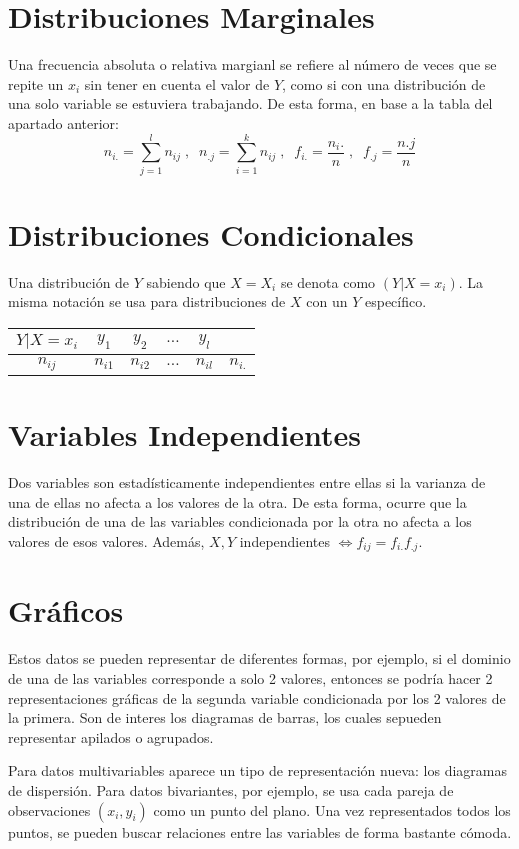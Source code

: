 \documentclass[10pt,a4paper]{book}
\begin{document}
\section{Distribuciones Marginales}
Una frecuencia absoluta o relativa margianl se refiere al número de veces que se repite un $x_i$ sin tener en cuenta el valor de $Y$, como si con una distribución de una solo variable se estuviera trabajando. De esta forma, en base a la tabla del apartado anterior: 
\[n_{i.} = \sum_{j = 1}^l n_{ij}\;,\;\;
n_{.j} = \sum_{i = 1}^kn_{ij}\;,\;\;
f_{i.} = \frac{n_i.}{n}\;,\;\;
f_{.j} = \frac{n.j}{n}\]
\section{Distribuciones Condicionales}
Una distribución de $Y$ sabiendo que $X = X_i$ se denota como $(Y|X = x_i)$. La misma notación se usa para distribuciones de $X$ con un $Y$ específico.
\begin{center}
\begin{tabular}{c|cccc|c}
	$Y|X=x_i$ & $y_1$ & $y_2$ & $\hdots$ & $y_l$ & \\
	\hline
	$n_{ij}$  & $n_{i1}$ & $n_{i2}$ & $\hdots$ & $n_{il}$ & $n_{i.}$
\end{tabular}
\end{center}
\section{Variables Independientes}
Dos variables son estadísticamente independientes entre ellas si la varianza de una de ellas no afecta a los valores de la otra. De esta forma, ocurre que la distribución de una de las variables condicionada por la otra no afecta a los valores de esos valores. Además, $X,Y$ independientes $\iff f_{ij} = f_{i.}f_{.j}$.
\section{Gráficos}
Estos datos se pueden representar de diferentes formas, por ejemplo, si el dominio de una de las variables corresponde a solo 2 valores, entonces se podría hacer 2 representaciones gráficas de la segunda variable condicionada por los 2 valores de la primera. Son de interes los diagramas de barras, los cuales sepueden representar apilados o agrupados. 

Para datos multivariables aparece un tipo de representación nueva: los diagramas de dispersión. Para datos bivariantes, por ejemplo, se usa cada pareja de observaciones $(x_i,y_i)$ como un punto del plano. Una vez representados todos los puntos, se pueden buscar relaciones entre las variables de forma bastante cómoda.
\end{document}
